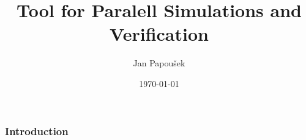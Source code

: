 \documentclass[xcolor=svgnames]{beamer}
\title[Parasim]{Tool for Paralell Simulations and Verification}
\author{Jan Papou\v{s}ek}
\institute{Masaryk University Brno}
\date{\today}
\begin{document}
\frame[plain]{\titlepage}
\begin{frame}
	\frametitle{Introduction}
\end{frame}
\end{document}
